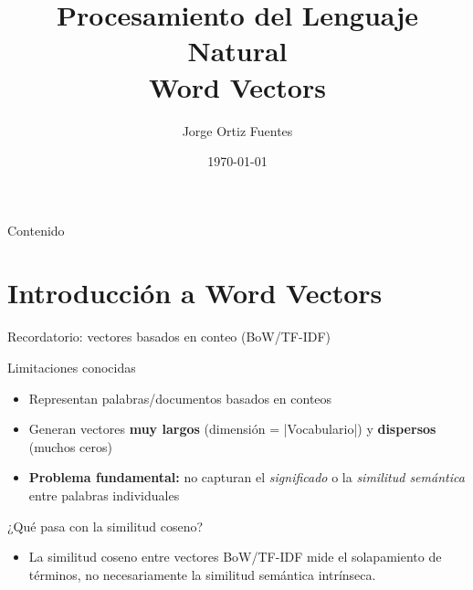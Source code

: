 \documentclass[handout]{beamer}
\title{Procesamiento del Lenguaje Natural \\ \large Word Vectors}
\author[Jorge Ortiz Fuentes]{Jorge Ortiz Fuentes}
\date{\today}
\begin{document}
\begin{frame}
  \titlepage
\end{frame}

\begin{frame}{Contenido}
  \tableofcontents
\end{frame}

\section{Introducción a Word Vectors}

\begin{frame}{Recordatorio: vectores basados en conteo (BoW/TF-IDF)}
  \begin{block}{Limitaciones conocidas}
    \begin{itemize}
      \item Representan palabras/documentos basados en conteos
      \item Generan vectores \textbf{muy largos} (dimensión = |Vocabulario|) y \textbf{dispersos} (muchos ceros)
      \item \textbf{Problema fundamental:} no capturan el \textit{significado} o la \textit{similitud semántica} entre palabras individuales
    \end{itemize}
  \end{block}

  \begin{alertblock}{¿Qué pasa con la similitud coseno?}
    \begin{itemize}
      \item La similitud coseno entre vectores BoW/TF-IDF mide el solapamiento de términos, no necesariamente la similitud semántica intrínseca.
    \end{itemize}
  \end{alertblock}
\end{frame}
\end{document}
